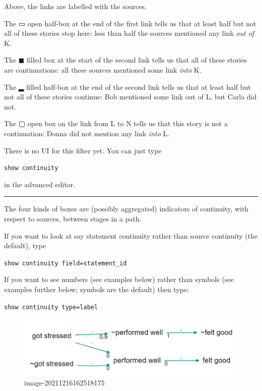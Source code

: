 \documentclass[
]{book}
\begin{document}
Above, the links are labelled with the sources.

The ▭ open half-box at the end of the first link tells us that at least half but not all of these stories stop here: less than half the sources mentioned any link \emph{out of} K.

The ◼ filled box at the start of the second link tells us that all of these stories are continuations: all these sources mentioned some link \emph{into} K.

The ▂ filled half-box at the end of the second link tells us that at least half but not all of these stories continue: Bob mentioned some link out of L, but Carla did not.

The ▢ open box on the link from L to N tells us that this story is not a continuation: Donna did not mention any link \emph{into} L.

There is no UI for this filter yet. You can just type

\texttt{show\ continuity}

in the advanced editor.

\begin{center}\rule{0.5\linewidth}{0.5pt}\end{center}

The four kinds of boxes are (possibly aggregated) indicators of continuity, with respect to sources, between stages in a path.

If you want to look at say statement continuity rather than source continuity (the default), type

\texttt{show\ continuity\ field=statement\_id}

If you want to see numbers (see examples below) rather than symbols (see examples further below; symbols are the default) then type:

\texttt{show\ continuity\ type=label}

\begin{figure}
\centering
\includegraphics[width=6.77083in,height=\textheight]{_assets/image-20211216162518175.png}
\caption{image-20211216162518175}
\end{figure}
\end{document}
